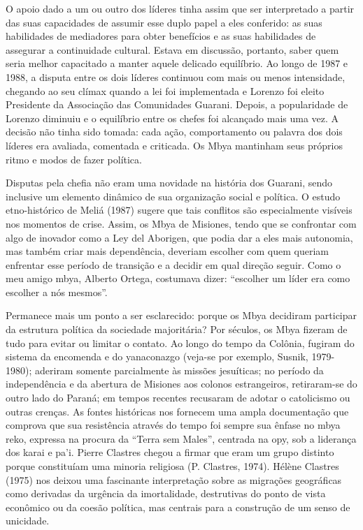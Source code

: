 {{O apoio dado a um ou outro dos líderes tinha assim que ser interpretado
a partir das suas capacidades de assumir esse duplo papel a eles
conferido: as suas habilidades de mediadores para obter benefícios e as
suas habilidades de assegurar a continuidade cultural. Estava em
discussão, portanto, saber quem seria melhor capacitado a manter aquele
delicado equilíbrio. Ao longo de 1987 e 1988, a disputa entre os dois
líderes continuou com mais ou menos intensidade, chegando ao seu clímax
quando a lei foi implementada e Lorenzo foi eleito Presidente da
Associação das Comunidades Guarani. Depois, a popularidade de Lorenzo
diminuiu e o equilíbrio entre os chefes foi alcançado mais uma vez. A
decisão não tinha sido tomada: cada ação, comportamento ou palavra dos
dois líderes era avaliada, comentada e criticada. Os Mbya mantinham
seus próprios ritmo e modos de fazer política. 

Disputas pela chefia não eram uma novidade na história dos Guarani,
sendo inclusive um elemento dinâmico de sua organização social e
política. O estudo etno-histórico de Meliá (1987) sugere que tais
conflitos são especialmente visíveis nos momentos de crise. Assim, os
Mbya de Misiones, tendo que se confrontar com algo de inovador como a
Ley del Aborigen, que podia dar a eles mais autonomia, mas também criar
mais dependência, deveriam escolher com quem queriam enfrentar esse
período de transição e a decidir em qual direção seguir. Como o meu
amigo mbya, Alberto Ortega, costumava dizer: ``escolher um líder era
como escolher a nós mesmos''.

Permanece mais um ponto a ser esclarecido: porque os Mbya decidiram
participar da estrutura política da sociedade majoritária? Por séculos,
os Mbya fizeram de tudo para evitar ou limitar o contato. Ao longo do
tempo da Colônia, fugiram do sistema da encomenda e do yanaconazgo
(veja-se por exemplo, Susnik, 1979-1980); aderiram somente parcialmente
às missões jesuíticas; no período da independência e da abertura de
Misiones aos colonos estrangeiros, retiraram-se do outro lado do
Paraná; em tempos recentes recusaram de adotar o catolicismo ou outras
crenças. As fontes históricas nos fornecem uma ampla documentação que
comprova que sua resistência através do tempo foi sempre sua ênfase no
mbya reko, expressa na procura da ``Terra sem Males'', centrada na opy,
sob a liderança dos karai e pa’i. Pierre Clastres chegou a firmar que
eram um grupo distinto porque constituíam uma minoria religiosa (P.
Clastres, 1974). Hélène Clastres (1975) nos deixou uma fascinante
interpretação sobre as migrações geográficas como derivadas da urgência
da imortalidade, destrutivas do ponto de vista econômico ou da coesão
política, mas centrais para a construção de um senso de unicidade. 

}}
